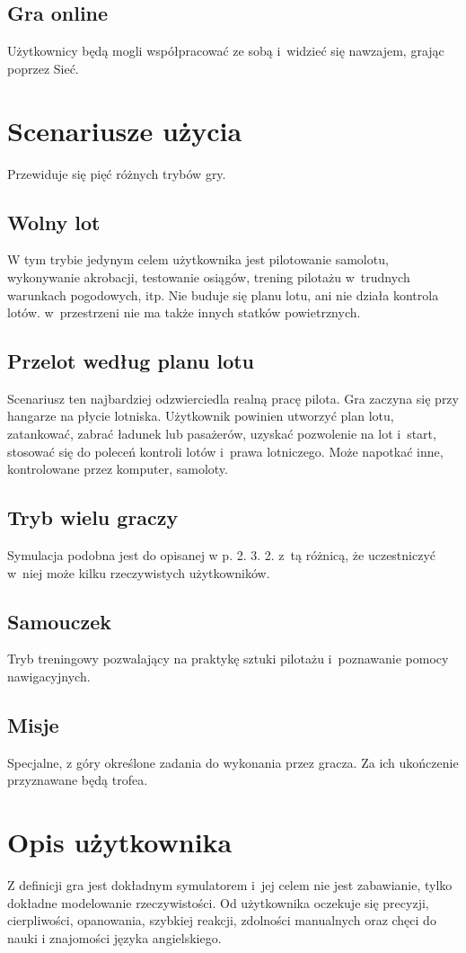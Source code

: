 \documentclass{mwrep}
\begin{document}
\subsection{Gra online}
Użytkownicy będą mogli współpracować ze sobą i~widzieć się nawzajem, grając poprzez Sieć.

\section{Scenariusze użycia}
Przewiduje się pięć różnych trybów gry.
\subsection{Wolny lot}
W tym trybie jedynym celem użytkownika jest pilotowanie samolotu, wykonywanie akrobacji, testowanie osiągów, trening pilotażu w~trudnych warunkach pogodowych, itp. Nie buduje się planu lotu, ani nie działa kontrola lotów. w~przestrzeni nie ma także innych statków powietrznych.
\subsection{Przelot według planu lotu}
Scenariusz ten najbardziej odzwierciedla realną pracę pilota. Gra zaczyna się przy hangarze na płycie lotniska. Użytkownik powinien utworzyć plan lotu, zatankować, zabrać ładunek lub pasażerów, uzyskać pozwolenie na lot i~start, stosować się do poleceń kontroli lotów i~prawa lotniczego. Może napotkać inne, kontrolowane przez komputer, samoloty.
\subsection{Tryb wielu graczy}
Symulacja podobna jest do opisanej w p. 2. 3. 2. z~tą różnicą, że uczestniczyć w~niej może kilku rzeczywistych użytkowników.
\subsection{Samouczek}
Tryb treningowy pozwalający na praktykę sztuki pilotażu i~poznawanie pomocy nawigacyjnych.
\subsection{Misje}
Specjalne, z góry określone zadania do wykonania przez gracza. Za ich ukończenie przyznawane będą trofea.

\section{Opis użytkownika}
Z definicji gra jest dokładnym symulatorem i~jej celem nie jest zabawianie, tylko dokładne modelowanie rzeczywistości. Od użytkownika oczekuje się precyzji, cierpliwości, opanowania, szybkiej reakcji, zdolności manualnych oraz chęci do nauki i znajomości języka angielskiego.
\end{document}
